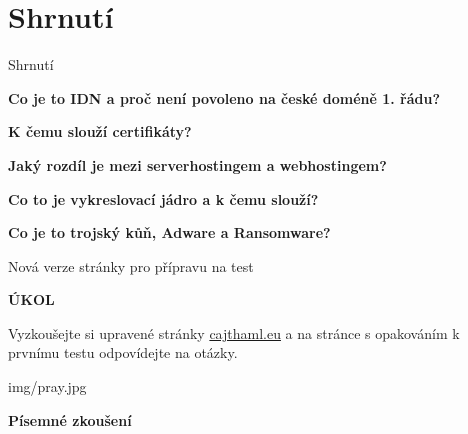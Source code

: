\documentclass[aspectratio=169]{beamer}
\begin{document}
\section{Shrnutí}
\begin{frame}{Shrnutí}
    \begin{cardTiny}
        \begin{center}
            \textbf{Co je to IDN a proč není povoleno na české doméně 1. řádu?}
        \end{center}
    \end{cardTiny}

    \begin{cardTiny}
        \begin{center}
        \textbf{K čemu slouží certifikáty?}
        \end{center}
    \end{cardTiny}

    \begin{cardTiny}
        \begin{center}
        \textbf{Jaký rozdíl je mezi serverhostingem a webhostingem?}
        \end{center}
    \end{cardTiny}

    \begin{cardTiny}
        \begin{center}
        \textbf{Co to je vykreslovací jádro a k čemu slouží?}
        \end{center}
    \end{cardTiny}

    \begin{cardTiny}
        \begin{center}
        \textbf{Co je to trojský kůň, Adware a Ransomware?}
        \end{center}
    \end{cardTiny}
\end{frame}


\begin{frame}{Nová verze stránky pro přípravu na test}
    \begin{cardTiny}
        \begin{center}
            \textbf{ÚKOL}
        \end{center}
        \begin{flushleft}
            Vyzkoušejte si upravené stránky \href{https://cajthaml.eu}{cajthaml.eu} a na stránce s opakováním k prvnímu testu odpovídejte na otázky.
        \end{flushleft}
    \end{cardTiny}
\end{frame}

\begin{frameImg}[width]{img/pray.jpg}
    \vspace*{60mm}
    \begin{cardTiny}
        \vspace*{\fill}
        \begin{center}
            \textbf{Písemné zkoušení}
        \end{center}
    \end{cardTiny}
\end{frameImg}
\end{document}
